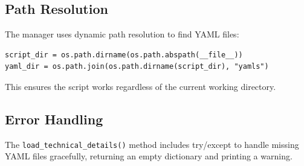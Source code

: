\documentclass[ctcc_full_documentation.tex]{subfiles}
\begin{document}
\subsection{Path Resolution}

The manager uses dynamic path resolution to find YAML files:
\begin{lstlisting}
script_dir = os.path.dirname(os.path.abspath(__file__))
yaml_dir = os.path.join(os.path.dirname(script_dir), "yamls")
\end{lstlisting}

This ensures the script works regardless of the current working directory.

\subsection{Error Handling}

The \texttt{load\_technical\_details()} method includes try/except to handle missing YAML files gracefully, returning an empty dictionary and printing a warning.
\end{document}
